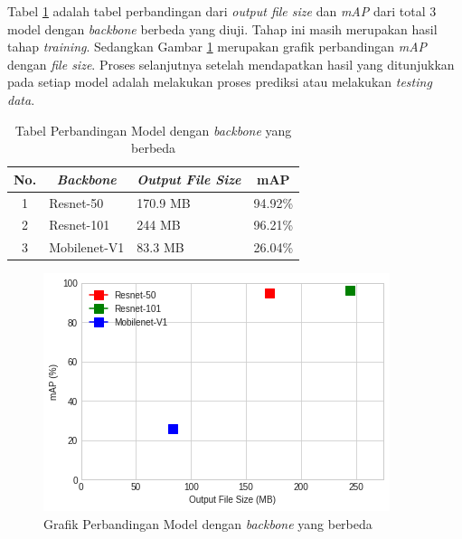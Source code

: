 Tabel \ref{tab:train-recap} adalah tabel perbandingan dari \textit{output file size} dan \textit{mAP} dari total 3 model dengan \textit{backbone} berbeda yang diuji. Tahap ini masih merupakan hasil tahap \textit{training}. Sedangkan Gambar \ref{fig:graph-recap} merupakan grafik perbandingan \textit{mAP} dengan \textit{file size}. Proses selanjutnya setelah mendapatkan hasil yang ditunjukkan pada setiap model adalah melakukan proses prediksi atau melakukan \textit{testing data}.

\begin{table}[h]
	\centering
	\caption{Tabel Perbandingan Model dengan \textit{backbone} yang berbeda}
	\begin{tabular}{|c|l|l|l|}
		\hline
		\textbf{No.} & \multicolumn{1}{c|}{\textit{\textbf{Backbone}}} & \multicolumn{1}{c|}{\textit{\textbf{Output File Size}}} & \multicolumn{1}{c|}{\textbf{mAP}} \\ \hline
		1            & Resnet-50                                       & 170.9 MB                                                & 94.92\%                           \\ \hline
		2            & Resnet-101                                      & 244 MB                                                  & 96.21\%                           \\ \hline
		3            & Mobilenet-V1                                    & 83.3 MB                                                 & 26.04\%                           \\ \hline
	\end{tabular}
	\label{tab:train-recap}
\end{table}

\newpage

\begin{figure}[h]
	\centering
	\includegraphics[scale=0.75]{gambar/graph-recap.png}
	\caption{Grafik Perbandingan Model dengan \textit{backbone} yang berbeda}
	\label{fig:graph-recap}
\end{figure}


